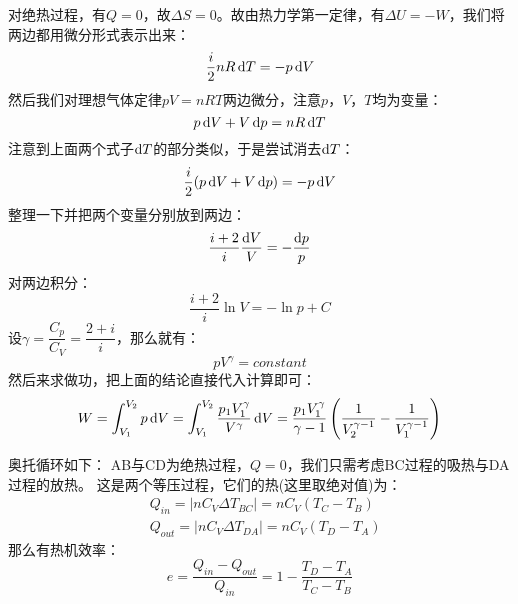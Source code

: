 \begin{prove}
    对绝热过程，有$Q = 0$，故$\Delta S = 0$。故由热力学第一定律，有$\Delta U = -W$，我们将两边都用微分形式表示出来：
    \begin{equation}
        \frac{i}{2}nR\dif{T} = -p\dif{V}
        \nonumber
    \end{equation}
    然后我们对理想气体定律$pV = nRT$两边微分，注意$p$，$V$，$T$均为变量：
    \begin{equation}
        p\dif{V} + V\dif{p} = nR \dif{T}
        \nonumber
    \end{equation}
    注意到上面两个式子$\dif{T}$的部分类似，于是尝试消去$\dif{T}$：
    \begin{equation}
        \frac{i}{2} (p\dif{V} + V\dif{p}) = -p\dif{V}
        \nonumber
    \end{equation}
    整理一下并把两个变量分别放到两边：
    \begin{equation}
        \frac{i+2}{i} \frac{\dif{V}}{V}  = -\frac{\dif{p}}{p}
        \nonumber
    \end{equation}
    对两边积分：
    \begin{equation}
        \frac{i+2}{i} \ln V  =-\ln p + C
        \nonumber
    \end{equation}
    设$\gamma = \dfrac{C_p}{C_V} = \dfrac{2+i}{i}$，那么就有：
    \begin{equation}
        pV^{\gamma} = constant
    \end{equation}
    然后来求做功，把上面的结论直接代入计算即可：
    \begin{equation}
        W = \int_{V_1}^{V_2} p\dif{V} =\int_{V_1}^{V_2} \frac{p_{1}V_{1}^{\gamma}}{V^{\gamma}}\dif{V}
        = \frac{p_{1}V_{1}^{\gamma}}{\gamma - 1}\left(\frac{1}{V_{2}^{\gamma-1}}-\frac{1}{V_1^{\gamma-1}}\right)
    \end{equation}
\end{prove}
\begin{prove}
    奥托循环如下：
    AB与CD为绝热过程，$Q = 0$，我们只需考虑BC过程的吸热与DA过程的放热。
    这是两个等压过程，它们的热(这里取绝对值)为：
    \begin{equation}
        \begin{aligned}
             & Q_{in}  = |nC_{V}\Delta T_{BC}|= nC_{V}(T_{C} - T_{B}) \\
             & Q_{out} = |nC_{V}\Delta T_{DA}|= nC_{V}(T_{D} - T_{A})
        \end{aligned}
        \nonumber
    \end{equation}
    那么有热机效率：
    \begin{equation}
        e = \frac{Q_{in}-Q_{out}}{Q_{in}} = 1 - \frac{T_{D} - T_{A}}{T_{C} - T_{B}}
    \end{equation}
\end{prove}
